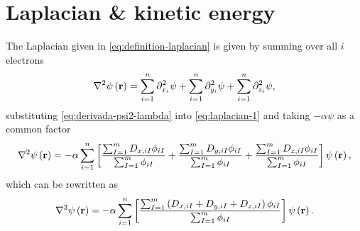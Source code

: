 \section{Laplacian \& kinetic energy}
The Laplacian given in \cref{eq:definition-laplacian} is given by summing
over all $i$ electrons 
\begin{equation} \label{eq:laplacian-1}
    \laplacian \psi \left( \mat{r} \right)
    =
    \sum_{i=1}^{n} \partial_{x_i}^{2} \psi +
    \sum_{i=1}^{n} \partial_{y_i}^{2} \psi +
    \sum_{i=1}^{n} \partial_{z_i}^{2} \psi
    ,
\end{equation}
substituting \cref{eq:derivada-psi2-lambda}
into \cref{eq:laplacian-1} and taking $-\alpha \psi$ as a common factor
\begin{equation}
    \laplacian \psi \left( \mat{r} \right)
    =
    -\alpha
    \sum_{i=1}^{n} 
    \left[
        \frac{
            \sum_{I=1}^{m} 
            D_{x,iI}
            \phi_{iI}
        }{
            \sum_{I=1}^{m} \phi_{iI}
        }
        +
        \frac{
            \sum_{I=1}^{m} 
            D_{y,iI}
            \phi_{iI}
        }{
            \sum_{I=1}^{m} \phi_{iI}
        }
        +
        \frac{
            \sum_{I=1}^{m} 
            D_{z,iI}
            \phi_{iI}
        }{
            \sum_{I=1}^{m} \phi_{iI}
        }
    \right]
    \psi \left( \mat{r} \right)
    ,
\end{equation}
which can be rewritten as
\begin{equation} \label{eq:laplacian-2}
    \laplacian \psi \left( \mat{r} \right)
    =
    -\alpha
    \sum_{i=1}^{n} 
    \left[
        \frac{
            \sum_{I=1}^{m} 
            \left(  
                D_{x,iI}
                +
                D_{y,iI}
                +
                D_{z,iI}
            \right)
            \phi_{iI}
        }{
            \sum_{I=1}^{m} \phi_{iI}
        }
    \right]
    \psi \left( \mat{r} \right)
    .
\end{equation}

